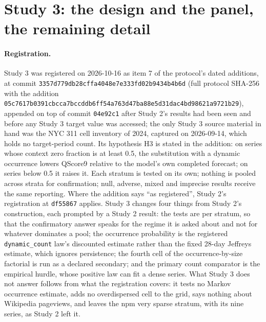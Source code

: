 \providecommand{\qs}{QScore9}
\providecommand{\hc}{\texttt{hurdle\_count\_28}}

\section{Study 3: the design and the panel, the remaining detail}
\label{app:s3detail}

\begin{sloppypar}
\paragraph{Registration.} Study 3 was registered on 2026-10-16 as item 7 of the protocol's dated additions,
at commit \texttt{3357d779db28cffa4048e7e333fd02b9434b4b6d} (full protocol SHA-256 with the addition
\texttt{05c7617b0391cbcca7bccddb6ff54a763d47ba88e5d31dac4bd98621a9721b29}), appended on top of commit
\texttt{04e92c1} after Study 2's results had been seen and before any Study 3 target value was accessed; the
only Study 3 source material in hand was the NYC 311 cell inventory of 2024, captured on 2026-09-14, which
holds no target-period count. Its hypothesis H3 is stated in the addition: on series whose context zero
fraction is at least 0.5, the substitution with a dynamic occurrence lowers \qs{} relative to the model's
own completed forecast; on series below 0.5 it raises it. Each stratum is tested on its own; nothing is
pooled across strata for confirmation; null, adverse, mixed and imprecise results receive the same reporting.
Where the addition says ``as registered'', Study 2's registration at \texttt{df55867} applies. Study 3
changes four things from Study 2's construction, each prompted by a Study 2 result: the tests are per
stratum, so that the confirmatory answer speaks for the regime it is asked about and not for whatever
dominates a pool; the occurrence probability is the registered \texttt{dynamic\_count} law's discounted
estimate rather than the fixed 28-day Jeffreys estimate, which ignores persistence; the fourth cell of the
occurrence-by-size factorial is run as a declared secondary; and the primary count comparator is the
empirical hurdle, whose positive law can fit a dense series. What Study 3 does not answer follows from what
the registration covers: it tests no Markov occurrence estimate, adds no overdispersed cell to the grid,
says nothing about Wikipedia pageviews, and leaves the npm very sparse stratum, with its nine series, as
Study 2 left it.
\end{sloppypar}

